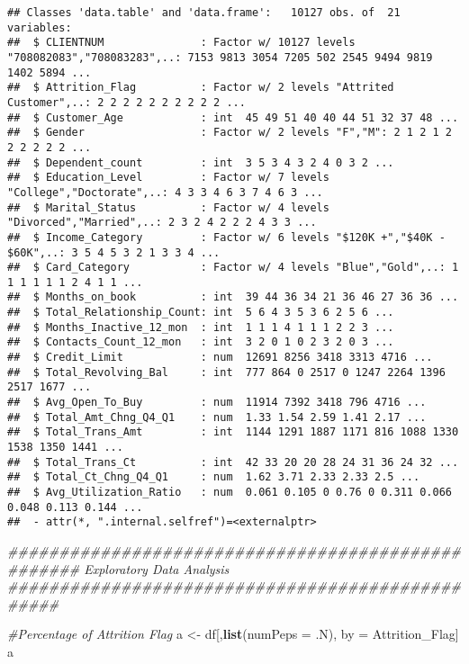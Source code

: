 \documentclass[]{article}
\newenvironment{Shaded}{\begin{snugshade}}{\end{snugshade}}
\newcommand{\CommentTok}[1]{\textcolor[rgb]{0.56,0.35,0.01}{\textit{#1}}}
\newcommand{\DataTypeTok}[1]{\textcolor[rgb]{0.13,0.29,0.53}{#1}}
\newcommand{\KeywordTok}[1]{\textcolor[rgb]{0.13,0.29,0.53}{\textbf{#1}}}
\newcommand{\NormalTok}[1]{#1}
\newcommand{\StringTok}[1]{\textcolor[rgb]{0.31,0.60,0.02}{#1}}
\begin{document}
\begin{verbatim}
## Classes 'data.table' and 'data.frame':   10127 obs. of  21 variables:
##  $ CLIENTNUM               : Factor w/ 10127 levels "708082083","708083283",..: 7153 9813 3054 7205 502 2545 9494 9819 1402 5894 ...
##  $ Attrition_Flag          : Factor w/ 2 levels "Attrited Customer",..: 2 2 2 2 2 2 2 2 2 2 ...
##  $ Customer_Age            : int  45 49 51 40 40 44 51 32 37 48 ...
##  $ Gender                  : Factor w/ 2 levels "F","M": 2 1 2 1 2 2 2 2 2 2 ...
##  $ Dependent_count         : int  3 5 3 4 3 2 4 0 3 2 ...
##  $ Education_Level         : Factor w/ 7 levels "College","Doctorate",..: 4 3 3 4 6 3 7 4 6 3 ...
##  $ Marital_Status          : Factor w/ 4 levels "Divorced","Married",..: 2 3 2 4 2 2 2 4 3 3 ...
##  $ Income_Category         : Factor w/ 6 levels "$120K +","$40K - $60K",..: 3 5 4 5 3 2 1 3 3 4 ...
##  $ Card_Category           : Factor w/ 4 levels "Blue","Gold",..: 1 1 1 1 1 1 2 4 1 1 ...
##  $ Months_on_book          : int  39 44 36 34 21 36 46 27 36 36 ...
##  $ Total_Relationship_Count: int  5 6 4 3 5 3 6 2 5 6 ...
##  $ Months_Inactive_12_mon  : int  1 1 1 4 1 1 1 2 2 3 ...
##  $ Contacts_Count_12_mon   : int  3 2 0 1 0 2 3 2 0 3 ...
##  $ Credit_Limit            : num  12691 8256 3418 3313 4716 ...
##  $ Total_Revolving_Bal     : int  777 864 0 2517 0 1247 2264 1396 2517 1677 ...
##  $ Avg_Open_To_Buy         : num  11914 7392 3418 796 4716 ...
##  $ Total_Amt_Chng_Q4_Q1    : num  1.33 1.54 2.59 1.41 2.17 ...
##  $ Total_Trans_Amt         : int  1144 1291 1887 1171 816 1088 1330 1538 1350 1441 ...
##  $ Total_Trans_Ct          : int  42 33 20 20 28 24 31 36 24 32 ...
##  $ Total_Ct_Chng_Q4_Q1     : num  1.62 3.71 2.33 2.33 2.5 ...
##  $ Avg_Utilization_Ratio   : num  0.061 0.105 0 0.76 0 0.311 0.066 0.048 0.113 0.144 ...
##  - attr(*, ".internal.selfref")=<externalptr>
\end{verbatim}

\begin{Shaded}
\begin{Highlighting}[]
\CommentTok{################################################### Exploratory Data Analysis #################################################}

\CommentTok{#Percentage of Attrition Flag }
\NormalTok{a <-}\StringTok{ }\NormalTok{df[,}\KeywordTok{list}\NormalTok{(}\DataTypeTok{numPeps =}\NormalTok{ .N), by =}\StringTok{ }\NormalTok{Attrition_Flag]}
\NormalTok{a}
\end{Highlighting}
\end{Shaded}
\end{document}
